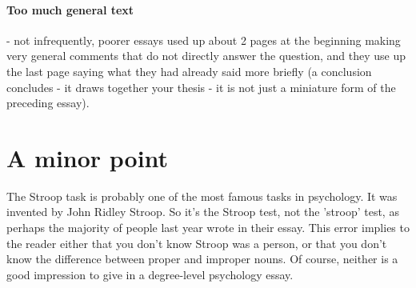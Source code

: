 \documentclass[11pt]{article}
\begin{document}
\paragraph{Too much general text} - not infrequently, poorer essays
used up about 2 pages at the beginning making very general comments
that do not directly answer the question, and they use up the last
page saying what they had already said more briefly (a conclusion
concludes - it draws together your thesis - it is not just a miniature
form of the preceding essay).

\section{A minor point}

The Stroop task is probably one of the most famous tasks in
psychology. It was invented by John Ridley Stroop. So it's the Stroop
test, not the 'stroop' test, as perhaps the majority of people last
year wrote in their essay. This error implies to the reader either
that you don't know Stroop was a person, or that you don't know the
difference between proper and improper nouns. Of course, neither is a
good impression to give in a degree-level psychology essay.


 {}
\end{document}
